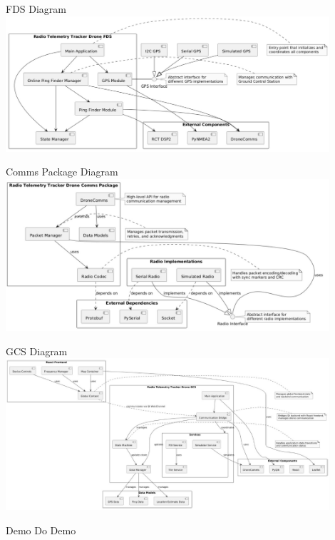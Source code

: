 \begin{frame}{FDS Diagram}
    \centering
    \includegraphics[height=0.7\textheight,width=0.9\textwidth,keepaspectratio]{images/rtt/fds-plantuml.jpg}
\end{frame}

\begin{frame}{Comms Package Diagram}
    \centering
    \includegraphics[height=0.9\textheight,width=0.9\textwidth,keepaspectratio]{images/rtt/comms-package-plantuml.jpg}
\end{frame}

\begin{frame}{GCS Diagram}
    \centering
    \includegraphics[height=0.9\textheight,width=0.9\textwidth,keepaspectratio]{images/rtt/gcs-plantuml.jpg}
\end{frame}

\begin{frame}{Demo}
    \centering
    Do Demo
\end{frame}

